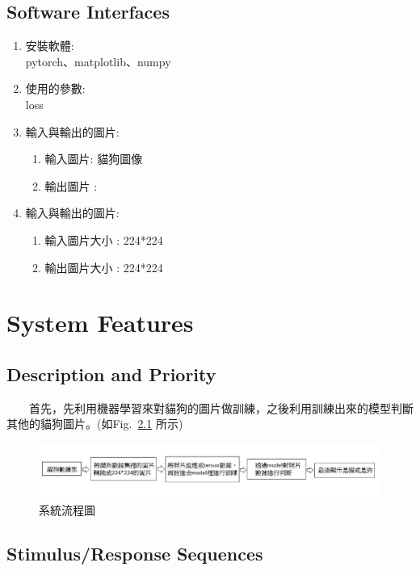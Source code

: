 \documentclass{scrreprt}
\begin{document}
\begin{CJK*}{UTF8}{bsmi}
\section{Software Interfaces}
\begin{enumerate}
	\item 安裝軟體:\\pytorch、matplotlib、numpy
	\item 使用的參數:\\loss
	\item 輸入與輸出的圖片:
	\begin{enumerate}
		\item 輸入圖片:  貓狗圖像
		\item 輸出圖片 : 
	\end{enumerate}
	\item 輸入與輸出的圖片:
	\begin{enumerate}
		\item 輸入圖片大小 :  224*224
		\item 輸出圖片大小 :  224*224 
	\end{enumerate}
\end{enumerate}



\chapter{System Features}

\section{Description and Priority}
　　首先，先利用機器學習來對貓狗的圖片做訓練，之後利用訓練出來的模型判斷其他的貓狗圖片。(如Fig. \,\ref{fig:4.1} 所示)\\
\begin{figure}[h]
\begin{center}
\includegraphics[width=18cm]{process.jpg} 
\end{center} 
\label{fig:4.1} 
\caption{系統流程圖} 
\end{figure}
\section{Stimulus/Response Sequences}



\end{CJK*}
\end{document}
